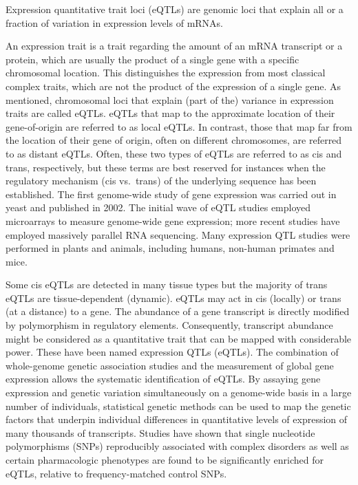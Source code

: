 Expression quantitative trait loci (eQTLs) are genomic loci that explain all or a fraction of variation in expression levels of mRNAs.

An expression trait is a trait regarding the amount of an mRNA transcript or a protein, which are usually the product of a single gene with a specific chromosomal location. This distinguishes the expression from most classical complex traits, which are not the product of the expression of a single gene. As mentioned, chromosomal loci that explain (part of the) variance in expression traits are called eQTLs. eQTLs that map to the approximate location of their gene-of-origin are referred to as local eQTLs. In contrast, those that map far from the location of their gene of origin, often on different chromosomes, are referred to as distant eQTLs. Often, these two types of eQTLs are referred to as cis and trans, respectively, but these terms are best reserved for instances when the regulatory mechanism (cis vs.~trans) of the underlying sequence has been established. The first genome-wide study of gene expression was carried out in yeast and published in 2002. The initial wave of eQTL studies employed microarrays to measure genome-wide gene expression; more recent studies have employed massively parallel RNA sequencing. Many expression QTL studies were performed in plants and animals, including humans, non-human primates and mice.

Some cis eQTLs are detected in many tissue types but the majority of trans eQTLs are tissue-dependent (dynamic). eQTLs may act in cis (locally) or trans (at a distance) to a gene. The abundance of a gene transcript is directly modified by polymorphism in regulatory elements. Consequently, transcript abundance might be considered as a quantitative trait that can be mapped with considerable power. These have been named expression QTLs (eQTLs). The combination of whole-genome genetic association studies and the measurement of global gene expression allows the systematic identification of eQTLs. By assaying gene expression and genetic variation simultaneously on a genome-wide basis in a large number of individuals, statistical genetic methods can be used to map the genetic factors that underpin individual differences in quantitative levels of expression of many thousands of transcripts. Studies have shown that single nucleotide polymorphisms (SNPs) reproducibly associated with complex disorders as well as certain pharmacologic phenotypes are found to be significantly enriched for eQTLs, relative to frequency-matched control SNPs.

